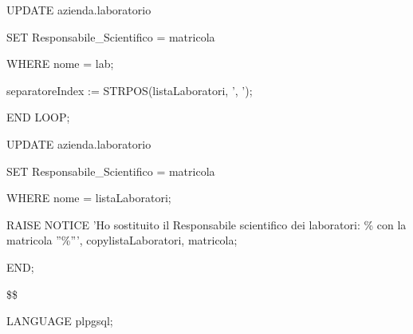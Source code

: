 \begin{flushleft}
\begin{description}
\begin{description}
\begin{description}
                            \vspace{0.5cm}

                            \item UPDATE azienda.laboratorio
                            \item SET Responsabile\_Scientifico  = matricola
                            \item WHERE nome = lab;
                            
                            \vspace{0.5cm}

                            \item separatoreIndex := STRPOS(listaLaboratori, ', ');
                        \end{description}
                        \item END LOOP;
                        \item UPDATE azienda.laboratorio
                        \item SET Responsabile\_Scientifico = matricola
                        \item WHERE nome = listaLaboratori;
                        \item RAISE NOTICE 'Ho sostituito il Responsabile scientifico dei laboratori: \% con la matricola ''\%''', copylistaLaboratori, matricola;
                    \end{description}
                    \item END;
                    \item \$\$
                    \item LANGUAGE plpgsql;
                \end{description}
            \end{flushleft}
        \normalfont



